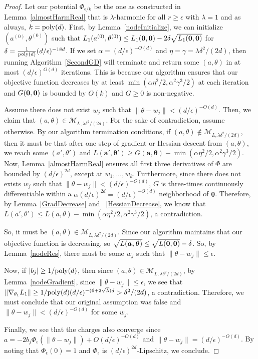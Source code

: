\begin{proof}
Let our potential $\Phi_{\epsilon/k}$ be the one as constructed in Lemma~\ref{almostHarmReal} that is $\lambda$-harmonic for all $r \geq \epsilon$ with $\lambda = 1$ and as always, $k = \mathrm{poly}(d)$. First, by Lemma~\ref{nodeInitialize},  we can initialize ${(a^{(0)},\theta^{(0)})}$ such that $L_1({a^{(0)},\theta^{(0)}}) \leq  L_1({\bf 0,0}) - 2\delta \sqrt{L_1({\bf 0,0})}$ for $ \delta = \frac{1}{\mathrm{poly}(d)}(d/\epsilon)^{ -18d}$. If we set $\alpha = (d/\epsilon)^{-O(d)}$ and $\eta = \gamma = \lambda \delta^2/(2d)$,  then running Algorithm~\ref{SecondGD} will terminate and return some $(a,\theta)$ in at most $(d/\epsilon)^{O(d)}$ iterations. This is because our algorithm ensures that our objective function decreases by at least $\min(\alpha \eta^2/2, \alpha^2\gamma^3/2)$ at each iteration and $G({\bf 0, 0})$ is bounded by $O(k)$ and $G \geq 0$ is non-negative.

Assume there does not exist $w_j$ such that $\|\theta - w_j\| < (d/\epsilon)^{-O(d)}$. Then, we claim that $(a,\theta) \in \mathcal{M}_{L,\lambda \delta^2/(2d)}$. For the sake of contradiction, assume otherwise. By our algorithm termination conditions, if $(a,\theta) \not\in \mathcal{M}_{L,\lambda \delta^2/(2d)}$, then it must be that after one step of gradient or Hessian descent from $(a,\theta)$, we reach some $(a',\theta')$ and $L(\boldsymbol{a',\theta'}) \geq G(\boldsymbol{a,\theta}) - \min(\alpha\eta^2/2,\alpha^2\gamma^3/2)$. Now, Lemma~\ref{almostHarmReal} ensures all first three derivatives of $\Phi$ are bounded by $(d/\epsilon)^{2d}$, except at $w_1,...,w_k$. Furthermore, since there does not exists $w_j$ such that $\|\theta - w_j\| < (d/\epsilon)^{-O(d)}$, $G$ is three-times continuously differentiable within a $\alpha (d/\epsilon)^{2d} = (d/\epsilon)^{-O(d)}$ neighborhood of $\boldsymbol{\theta}$. Therefore, by Lemma~\ref{GradDecrease} and ~\ref{HessianDecrease}, we know that $L(a',\theta') \leq L(a,\theta) - \min(\alpha\eta^2/2,\alpha^2\gamma^3/2)$, a contradiction. 

So, it must be $(a,\theta) \in \mathcal{M}_{L,\lambda \delta^2/(2d)}$. Since our algorithm maintains that our objective function is decreasing, so $\sqrt{L(\boldsymbol{a,\theta})} \leq \sqrt{L({\bf 0,0})} - \delta $. So, by Lemma~\ref{nodeRes}, there must be some $w_j$ such that $\|\theta- w_j\|\leq \epsilon$.

Now, if $|b_j| \geq 1/\mathrm{poly}(d)$, then since $(a,\theta) \in \mathcal{M}_{L,\lambda \delta^2/(2d)}$, by Lemma~\ref{nodeGradient}, since $\|\theta - w_j \| \leq \epsilon$, we see that $\|\nabla_{\theta_1}L_1 \| \geq 1/\mathrm{poly}(d)(d/\epsilon)^{-(6+2\sqrt{\lambda})d} > \delta^2/(2d)$, a contradiction. Therefore, we must conclude that our original assumption was false and $\|\theta - w_j\| < (d/\epsilon)^{-O(d)}$ for some $w_j$.

Finally, we see that the charges also converge since $a = -2b_j \Phi_\epsilon(\|\theta - w_j\|) + O(d/\epsilon)^{-O(d)}$ and $\|\theta - w_j\| = (d/\epsilon)^{-O(d)}$. By noting that $\Phi_\epsilon(0) = 1$ and $\Phi_\epsilon$ is $(d/\epsilon)^{2d}$-Lipschitz, we conclude. 
\end{proof}

